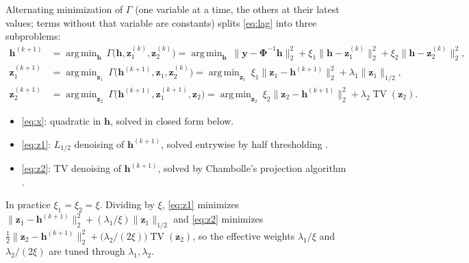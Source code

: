 \documentclass[11pt,a4paper]{article}
\theoremstyle{definition}
\DeclareMathOperator*{\argmin}{arg\,min}
\DeclareMathOperator{\TV}{TV}
\newcommand{\x}{\mathbf h}
\newcommand{\y}{\mathbf y}
\newcommand{\zo}{\mathbf z_1}
\newcommand{\zt}{\mathbf z_2}
\newcommand{\bPhi}{\boldsymbol\Phi}
\begin{document}
Alternating minimization of $\Gamma$ (one variable at a time, the others at their latest values; terms without that variable are constants)
splits \eqref{eq:lag} into three subproblems:
\begin{align}
  \x^{(k+1)}
  &= \argmin_{\x}\ \Gamma\bigl(\x, \zo^{(k)}, \zt^{(k)}\bigr)
   = \argmin_{\x}\ \bigl\lVert \y - \bPhi^{-1}\x \bigr\rVert_2^2
     + \xi_1 \bigl\lVert \x - \zo^{(k)} \bigr\rVert_2^2 + \xi_2 \bigl\lVert \x - \zt^{(k)} \bigr\rVert_2^2 , \label{eq:x} \\
  \zo^{(k+1)}
  &= \argmin_{\zo}\ \Gamma\bigl(\x^{(k+1)}, \zo, \zt^{(k)}\bigr)
   = \argmin_{\zo}\ \xi_1 \bigl\lVert \zo - \x^{(k+1)} \bigr\rVert_2^2 + \lambda_1 \lVert \zo \rVert_{1/2} , \label{eq:z1} \\
  \zt^{(k+1)}
  &= \argmin_{\zt}\ \Gamma\bigl(\x^{(k+1)}, \zo^{(k+1)}, \zt\bigr)
   = \argmin_{\zt}\ \xi_2 \bigl\lVert \zt - \x^{(k+1)} \bigr\rVert_2^2 + \lambda_2 \TV(\zt) . \label{eq:z2}
\end{align}
\begin{itemize}
  \item \eqref{eq:x}: quadratic in $\x$, solved in closed form below.
  \item \eqref{eq:z1}: $L_{1/2}$ denoising of $\x^{(k+1)}$, solved entrywise by half thresholding \cite{xu2012}.
  \item \eqref{eq:z2}: TV denoising of $\x^{(k+1)}$, solved by Chambolle's projection algorithm \cite{chambolle2004}.
\end{itemize}
In practice $\xi_1 = \xi_2 = \xi$. Dividing by $\xi$, \eqref{eq:z1} minimizes
$\lVert \zo - \x^{(k+1)} \rVert_2^2 + (\lambda_1/\xi) \lVert \zo \rVert_{1/2}$ and \eqref{eq:z2} minimizes
$\tfrac12 \lVert \zt - \x^{(k+1)} \rVert_2^2 + \bigl(\lambda_2/(2\xi)\bigr) \TV(\zt)$,
so the effective weights $\lambda_1/\xi$ and $\lambda_2/(2\xi)$ are tuned through $\lambda_1, \lambda_2$.

\end{document}
